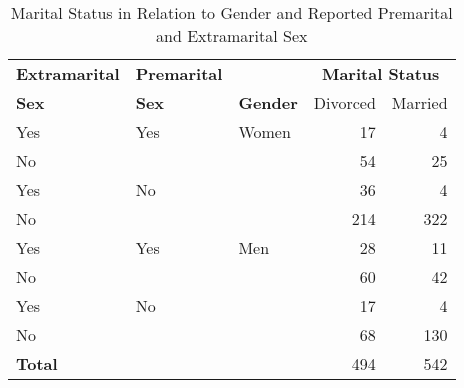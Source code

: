 \begin{table}[htb]
 \caption{Marital Status in Relation to Gender and Reported Premarital and Extramarital Sex}
 \label{tab:maridat}
 \begin{center}
  \begin{tabular}{|lll|rr|}
   \hline
{\bfseries\large Extramarital} & {\bfseries\large Premarital} &  & \multicolumn{2}{c|}{\bfseries\large Marital Status}\rule{0in}{2.5ex}\\
{\bfseries\large Sex} & {\bfseries\large Sex} & {\bfseries\large Gender} & Divorced  & Married   \\
   \hline
Yes            & Yes          & Women    &         17 &          4 \\
No             &              &          &         54 &         25 \\
[4pt]
Yes            & No           &          &         36 &          4 \\
No             &              &          &        214 &        322 \\
[4pt]
Yes            & Yes          & Men      &         28 &         11 \\
No             &              &          &         60 &         42 \\
[4pt]
Yes            & No           &          &         17 &          4 \\
No             &              &          &         68 &        130 \\
   \hline
\rule{0in}{2.5ex}{\bfseries\large Total} & & &       494 &        542 \\
   \hline
  \end{tabular}
 \end{center}
\end{table}
